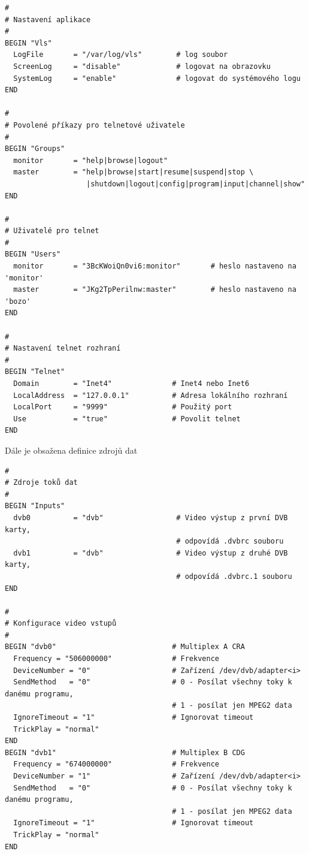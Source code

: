 \vspace{10pt}

\begin{small}
\begin{verbatim}
#
# Nastavení aplikace
#
BEGIN "Vls"
  LogFile       = "/var/log/vls"        # log soubor
  ScreenLog     = "disable"             # logovat na obrazovku
  SystemLog     = "enable"              # logovat do systémového logu
END

#
# Povolené příkazy pro telnetové uživatele
#
BEGIN "Groups"
  monitor       = "help|browse|logout"
  master        = "help|browse|start|resume|suspend|stop \
                   |shutdown|logout|config|program|input|channel|show"
END

#
# Uživatelé pro telnet
#
BEGIN "Users"
  monitor       = "3BcKWoiQn0vi6:monitor"       # heslo nastaveno na 'monitor'
  master        = "JKg2TpPerilnw:master"        # heslo nastaveno na 'bozo'
END

#
# Nastavení telnet rozhraní
#
BEGIN "Telnet"
  Domain        = "Inet4"              # Inet4 nebo Inet6
  LocalAddress  = "127.0.0.1"          # Adresa lokálního rozhraní
  LocalPort     = "9999"               # Použitý port
  Use           = "true"               # Povolit telnet
END
\end{verbatim}
\end{small}

\vspace{10pt}

Dále je obsažena definice zdrojů dat

\vspace{10pt}

\begin{small}
\begin{verbatim}
#
# Zdroje toků dat
#
BEGIN "Inputs"
  dvb0          = "dvb"                 # Video výstup z první DVB karty, 
                                        # odpovídá .dvbrc souboru
  dvb1          = "dvb"                 # Video výstup z druhé DVB karty, 
                                        # odpovídá .dvbrc.1 souboru
END

#
# Konfigurace video vstupů
#
BEGIN "dvb0"                           # Multiplex A CRA
  Frequency = "506000000"              # Frekvence
  DeviceNumber = "0"                   # Zařízení /dev/dvb/adapter<i>
  SendMethod   = "0"                   # 0 - Posílat všechny toky k danému programu, 
                                       # 1 - posílat jen MPEG2 data
  IgnoreTimeout = "1"                  # Ignorovat timeout
  TrickPlay = "normal"                 
END
BEGIN "dvb1"                           # Multiplex B CDG
  Frequency = "674000000"              # Frekvence
  DeviceNumber = "1"                   # Zařízení /dev/dvb/adapter<i>
  SendMethod   = "0"                   # 0 - Posílat všechny toky k danému programu, 
                                       # 1 - posílat jen MPEG2 data
  IgnoreTimeout = "1"                  # Ignorovat timeout
  TrickPlay = "normal"
END
\end{verbatim}
\end{small}

